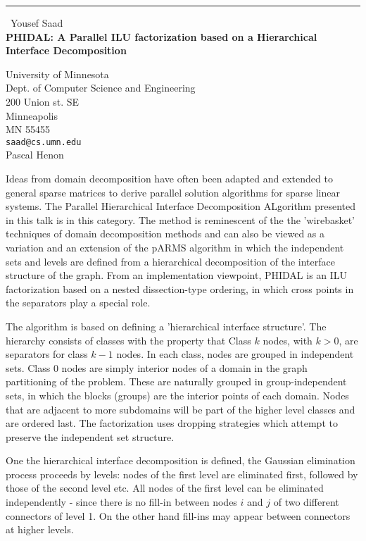 \documentclass{report}
\begin{document}
\begin{center}
\rule{6in}{1pt} \
{\large Yousef Saad \\
{\bf PHIDAL: A Parallel ILU factorization based on a Hierarchical Interface Decomposition}}

University of Minnesota  \\ Dept. of Computer Science and Engineering \\ 200 Union st. SE \\ Minneapolis \\ MN 55455
\\
{\tt saad@cs.umn.edu}\\
Pascal Henon\end{center}


Ideas from domain decomposition have often been adapted and extended
to general sparse matrices to derive parallel solution algorithms for
sparse linear systems. The Parallel Hierarchical Interface
Decomposition ALgorithm presented in this talk is in this category.
The method is reminescent of the the 'wirebasket' techniques of domain
decomposition methods \cite{SMITH} and can also be viewed as a
variation and an extension of the pARMS algorithm \cite{pARMS} in
which the independent sets and levels are defined from a hierarchical
decomposition of the interface structure of the graph. From an
implementation viewpoint, PHIDAL is an ILU factorization based on a
nested dissection-type ordering, in which cross points in the
separators play a special role.

The algorithm is based on defining a 'hierarchical interface
structure'. The hierarchy consists of classes with the property that
Class $k$ nodes, with $k>0$, are separators for class $k-1$ nodes. In
each class, nodes are grouped in independent sets. Class $0$ nodes
are simply interior nodes of a domain in the graph partitioning of the
problem. These are naturally grouped in group-independent sets, in
which the blocks (groups) are the interior points of each domain.
Nodes that are adjacent to more subdomains will be part of the higher
level classes and are ordered last. The factorization uses dropping
strategies which attempt to preserve the independent set structure.

One the hierarchical interface decomposition is defined, the Gaussian
elimination process proceeds by levels: nodes of the first level are
eliminated first, followed by those of the second level etc. All
nodes of the first level can be eliminated independently - since there
is no fill-in between nodes $i$ and $j$ of two different connectors of
level 1. On the other hand fill-ins may appear between connectors at
higher levels.
\end{document}

